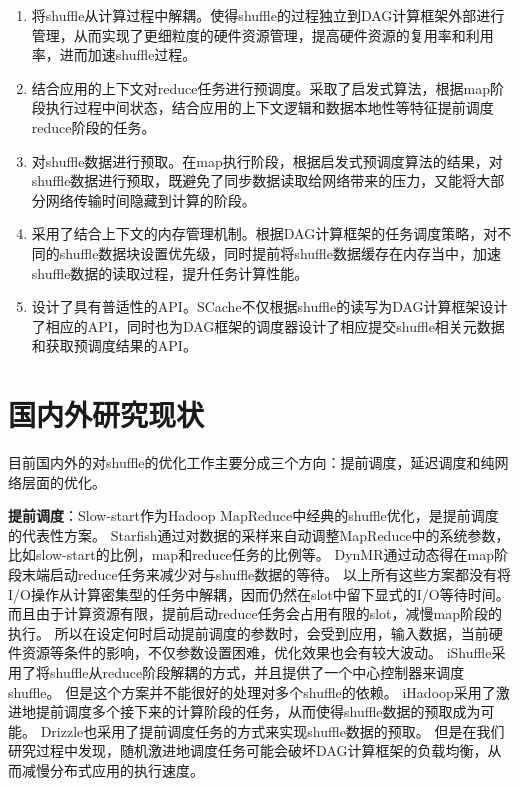 \begin{enumerate}
	\item 将shuffle从计算过程中解耦。使得shuffle的过程独立到DAG计算框架外部进行管理，从而实现了更细粒度的硬件资源管理，提高硬件资源的复用率和利用率，进而加速shuffle过程。
	\item 结合应用的上下文对reduce任务进行预调度。采取了启发式算法，根据map阶段执行过程中间状态，结合应用的上下文逻辑和数据本地性等特征提前调度reduce阶段的任务。
	\item 对shuffle数据进行预取。在map执行阶段，根据启发式预调度算法的结果，对shuffle数据进行预取，既避免了同步数据读取给网络带来的压力，又能将大部分网络传输时间隐藏到计算的阶段。
	\item 采用了结合上下文的内存管理机制。根据DAG计算框架的任务调度策略，对不同的shuffle数据块设置优先级，同时提前将shuffle数据缓存在内存当中，加速shuffle数据的读取过程，提升任务计算性能。
	\item 设计了具有普适性的API。SCache不仅根据shuffle的读写为DAG计算框架设计了相应的API，同时也为DAG框架的调度器设计了相应提交shuffle相关元数据和获取预调度结果的API。
\end{enumerate}

\section{国内外研究现状}
\label{sec:relatedwork}

目前国内外的对shuffle的优化工作主要分成三个方向：提前调度，延迟调度和纯网络层面的优化。

\textbf{提前调度}：Slow-start作为Hadoop MapReduce\cite{hadoop}中经典的shuffle优化，是提前调度的代表性方案。
Starfish\cite{starfish}通过对数据的采样来自动调整MapReduce中的系统参数，比如slow-start的比例，map和reduce任务的比例等。
DynMR\cite{dynmr}通过动态得在map阶段末端启动reduce任务来减少对与shuffle数据的等待。
以上所有这些方案都没有将I/O操作从计算密集型的任务中解耦，因而仍然在slot中留下显式的I/O等待时间。
而且由于计算资源有限，提前启动reduce任务会占用有限的slot，减慢map阶段的执行。
所以在设定何时启动提前调度的参数时，会受到应用，输入数据，当前硬件资源等条件的影响，不仅参数设置困难，优化效果也会有较大波动。
iShuffle\cite{ishuffle}采用了将shuffle从reduce阶段解耦的方式，并且提供了一个中心控制器来调度shuffle。
但是这个方案并不能很好的处理对多个shuffle的依赖。
iHadoop\cite{ihadoop}采用了激进地提前调度多个接下来的计算阶段的任务，从而使得shuffle数据的预取成为可能。
Drizzle\cite{drizzle}也采用了提前调度任务的方式来实现shuffle数据的预取。
但是在我们研究过程中发现，随机激进地调度任务可能会破坏DAG计算框架的负载均衡，从而减慢分布式应用的执行速度。

